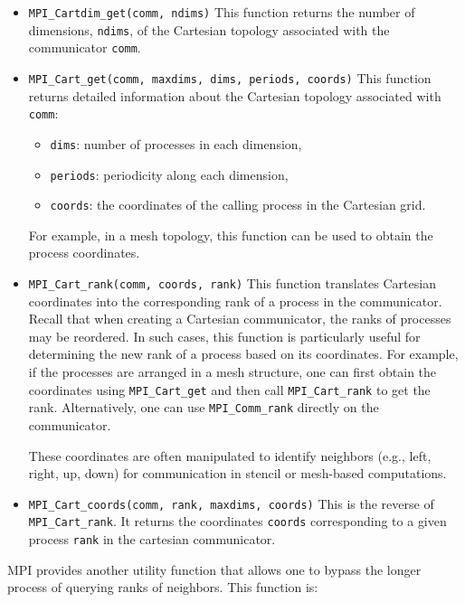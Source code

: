 \documentclass[12pt]{book}
\begin{document}
\begin{itemize}
    \item \texttt{MPI\_Cartdim\_get(comm, ndims)}  
    This function returns the number of dimensions, \texttt{ndims}, of the Cartesian topology associated with the communicator \texttt{comm}.

    \item \texttt{MPI\_Cart\_get(comm, maxdims, dims, periods, coords)}  
    This function returns detailed information about the Cartesian topology associated with \texttt{comm}:  
    \begin{itemize}
        \item \texttt{dims}: number of processes in each dimension,  
        \item \texttt{periods}: periodicity along each dimension,  
        \item \texttt{coords}: the coordinates of the calling process in the Cartesian grid.  
    \end{itemize}
    For example, in a mesh topology, this function can be used to obtain the process coordinates.

    \item \texttt{MPI\_Cart\_rank(comm, coords, rank)}  
    This function translates Cartesian coordinates into the corresponding rank of a process in the communicator.  
    Recall that when creating a Cartesian communicator, the ranks of processes may be reordered. In such cases, this function is particularly useful for determining the new rank of a process based on its coordinates. For example, if the processes are arranged in a mesh structure, one can first obtain the coordinates using \texttt{MPI\_Cart\_get} and then call \texttt{MPI\_Cart\_rank} to get the rank. Alternatively, one can use \texttt{MPI\_Comm\_rank} directly on the communicator.  

    These coordinates are often manipulated to identify neighbors (e.g., left, right, up, down) for communication in stencil or mesh-based computations.

    \item \texttt{MPI\_Cart\_coords(comm, rank, maxdims, coords)}  
    This is the reverse of \texttt{MPI\_Cart\_rank}. It returns the coordinates \texttt{coords} corresponding to a given process \texttt{rank} in the cartesian communicator.
\end{itemize}

MPI provides another utility function that allows one to bypass the longer process of querying ranks of neighbors. This function is:
\end{document}
